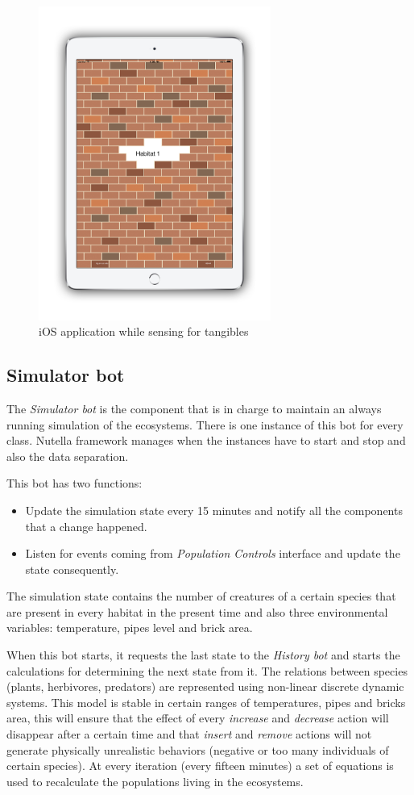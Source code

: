 \begin{figure}
\centering
\includegraphics[width=3in]{images/wallcology-ios-sensing.png}
\caption{iOS application while sensing for tangibles}
\label{fig:wallcology_ios_config_sensing}
\end{figure}

\subsection{Simulator bot}
The \textit{Simulator bot} is the component that is in charge to maintain an always running simulation of the ecosystems. There is one instance of this bot for every class. Nutella framework manages when the instances have to start and stop and also the data separation.

This bot has two functions:
\begin{itemize}
\item Update the simulation state every 15 minutes and notify all the components that a change happened.
\item Listen for events coming from \textit{Population Controls} interface and update the state consequently.
\end{itemize}

The simulation state contains the number of creatures of a certain species that are present in every habitat in the present time and also three environmental variables: temperature, pipes level and brick area.

When this bot starts, it requests the last state to the \textit{History bot} and starts the calculations for determining the next state from it. The relations between species (plants, herbivores, predators) are represented using non-linear discrete dynamic systems. This model is stable in certain ranges of temperatures, pipes and bricks area, this will ensure that the effect of every \textit{increase} and \textit{decrease} action will disappear after a certain time and that \textit{insert} and \textit{remove} actions will not generate physically unrealistic behaviors (negative or too many individuals of certain species). At every iteration (every fifteen minutes) a set of equations is used to recalculate the populations living in the ecosystems.

